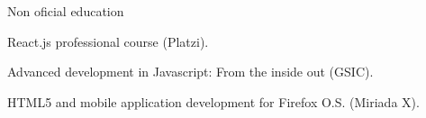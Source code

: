 \begin{cventries}

\cventry
{Non oficial education} %
{} %
{} %
{} %
{ %
\begin{cvitems}
\item {React.js professional course (Platzi).}
\item {Advanced development in Javascript: From the inside out (GSIC).}
\item {HTML5 and mobile application development for Firefox O.S. (Miriada X).}
\end{cvitems}
}

\end{cventries}